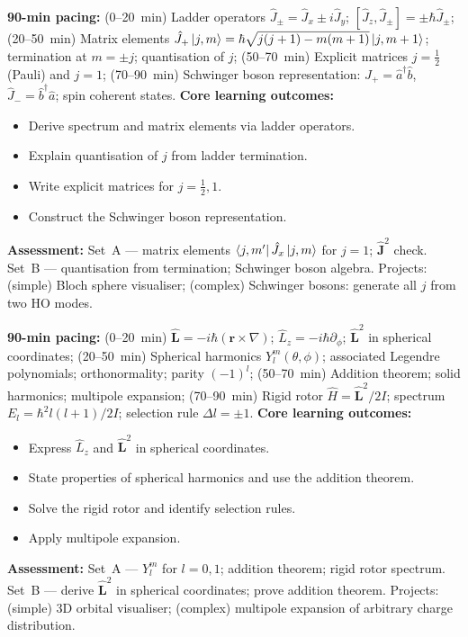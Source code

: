 \documentclass[11pt,a4paper]{article}
\begin{document}
\begin{tcolorbox}[modulebox, title={Module~II.3 --- Lecture L02: Ladder Operators and Spectrum}]
\textbf{90-min pacing:} (0--20~min) Ladder operators $\hat{J}_\pm=\hat{J}_x\pm i\hat{J}_y$; $[\hat{J}_z,\hat{J}_\pm]=\pm\hbar\hat{J}_\pm$; (20--50~min) Matrix elements $\hat{J}_+\ket{j,m}=\hbar\sqrt{j(j+1)-m(m+1)}\ket{j,m+1}$; termination at $m=\pm j$; quantisation of $j$; (50--70~min) Explicit matrices $j=\tfrac{1}{2}$ (Pauli) and $j=1$; (70--90~min) Schwinger boson representation: $\hat{J}_+=\hat{a}^\dagger\hat{b}$, $\hat{J}_-=\hat{b}^\dagger\hat{a}$; spin coherent states.
\medskip\textbf{Core learning outcomes:}
\begin{itemize}[leftmargin=1.4em,topsep=2pt,itemsep=1pt]
  \item Derive spectrum and matrix elements via ladder operators.
  \item Explain quantisation of $j$ from ladder termination.
  \item Write explicit matrices for $j=\tfrac{1}{2},1$.
  \item Construct the Schwinger boson representation.
\end{itemize}
\medskip\textbf{Assessment:}
Set~A --- matrix elements $\bra{j,m'}\hat{J}_x\ket{j,m}$ for $j=1$; $\hat{\mathbf{J}}^2$ check.
Set~B --- quantisation from termination; Schwinger boson algebra.
Projects: (simple) Bloch sphere visualiser; (complex) Schwinger bosons: generate all $j$ from two HO modes.
\end{tcolorbox}

\medskip

\begin{tcolorbox}[modulebox, title={Module~II.3 --- Lecture L03: Orbital Angular Momentum and Spherical Harmonics}]
\textbf{90-min pacing:} (0--20~min) $\hat{\mathbf{L}}=-i\hbar(\mathbf{r}\times\nabla)$; $\hat{L}_z=-i\hbar\partial_\phi$; $\hat{\mathbf{L}}^2$ in spherical coordinates; (20--50~min) Spherical harmonics $Y_l^m(\theta,\phi)$; associated Legendre polynomials; orthonormality; parity $(-1)^l$; (50--70~min) Addition theorem; solid harmonics; multipole expansion; (70--90~min) Rigid rotor $\hat{H}=\hat{\mathbf{L}}^2/2I$; spectrum $E_l=\hbar^2l(l+1)/2I$; selection rule $\Delta l=\pm1$.
\medskip\textbf{Core learning outcomes:}
\begin{itemize}[leftmargin=1.4em,topsep=2pt,itemsep=1pt]
  \item Express $\hat{L}_z$ and $\hat{\mathbf{L}}^2$ in spherical coordinates.
  \item State properties of spherical harmonics and use the addition theorem.
  \item Solve the rigid rotor and identify selection rules.
  \item Apply multipole expansion.
\end{itemize}
\medskip\textbf{Assessment:}
Set~A --- $Y_l^m$ for $l=0,1$; addition theorem; rigid rotor spectrum.
Set~B --- derive $\hat{\mathbf{L}}^2$ in spherical coordinates; prove addition theorem.
Projects: (simple) 3D orbital visualiser; (complex) multipole expansion of arbitrary charge distribution.
\end{tcolorbox}
\end{document}
